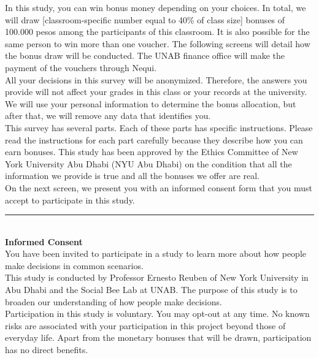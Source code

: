 \documentclass[11pt,a4paper,oneside]{article}
\begin{document}
\noindent In this study, you can win bonus money depending on your choices. In total, we will draw [classroom-specific number equal to 40\% of class size] bonuses of 100.000 pesos among the participants of this classroom. It is also possible for the same person to win more than one voucher. The following screens will detail how the bonus draw will be conducted. The UNAB finance office will make the payment of the vouchers through Nequi.\\

\noindent All your decisions in this survey will be anonymized. Therefore, the answers you provide will not affect your grades in this class or your records at the university. We will use your personal information to determine the bonus allocation, but after that, we will remove any data that identifies you. \\

\noindent This survey has several parts. Each of these parts has specific instructions. Please read the instructions for each part carefully because they describe how you can earn bonuses. This study has been approved by the Ethics Committee of New York University Abu Dhabi (NYU Abu Dhabi) on the condition that all the information we provide is true and all the bonuses we offer are real.\\

\noindent On the next screen, we present you with an informed consent form that you must accept to participate in this study.

\noindent\rule{\textwidth}{0.4pt}\\

\noindent \textbf{Informed Consent} \\ 

\noindent You have been invited to participate in a study to learn more about how people make decisions in common scenarios. \\

\noindent  This study is conducted by Professor Ernesto Reuben of New York University in Abu Dhabi and the Social Bee Lab at UNAB. The purpose of this study is to broaden our understanding of how people make decisions. \\

\noindent  Participation in this study is voluntary. You may opt-out at any time. No known risks are associated with your participation in this project beyond those of everyday life. Apart from the monetary bonuses that will be drawn, participation has no direct benefits.\\
\end{document}
